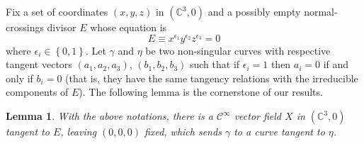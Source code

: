 \documentclass[a4paper,10pt]{amsart}
\newtheorem{lemma}{Lemma}
\begin{document}
Fix a set of coordinates $(x,y,z)$ in $(\mathbb{C}^3,0)$ and a possibly empty normal-crossings divisor $E$ whose equation is
\begin{equation*}
  E\equiv x^{\epsilon_1}y^{\epsilon_2}z^{\epsilon_3}=0
\end{equation*}
where $\epsilon_i\in \left\{ 0,1 \right\}$. Let $\gamma$ and $\eta$ be two non-singular curves with respective tangent vectors $(a_1,a_2,a_3)$, $(b_1,b_2,b_3)$ such that if $\epsilon_i=1$ then $a_i=0$ if and only if $b_i=0$ (that is, they have the same tangency relations with the irreducible components of $E$). The following lemma is the cornerstone of our results. 
\begin{lemma}\label{lem:motion-with-fixed-planes}
  With the above notations, there is a $\mathcal{C}^{\infty}$ vector field $X$ in $(\mathbb{C}^3,0)$ tangent to $E$, leaving $(0,0,0)$ fixed, which sends $\gamma$ to a curve tangent to $\eta$.
\end{lemma}
\end{document}
